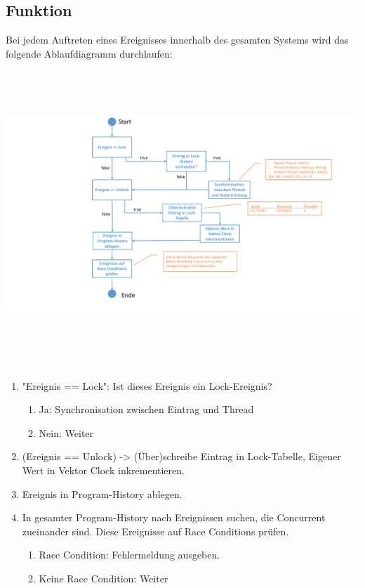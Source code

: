 \documentclass[10pt,a4paper]{article}
\begin{document}
\subsection{Funktion}
\begin{flushleft}
Bei jedem Auftreten eines Ereignisses innerhalb des gesamten Systems wird das folgende Ablaufdiagramm durchlaufen:\\[0,5cm]
	\includegraphics[width=16cm,height=11.5cm,trim=60mm 0mm 20mm 0mm, clip]{pictures/Ablaufdiagramm_Algorithmus.pdf}\\

\begin{enumerate}
\item "Ereignis == Lock": Ist dieses Ereignis ein Lock-Ereignis?
	\begin{enumerate}
	\item Ja: Synchronisation zwischen Eintrag und Thread
	\item Nein: Weiter
	\end{enumerate}
\item (Ereignis == Unlock) -> (Über)schreibe Eintrag in Lock-Tabelle, Eigener Wert in Vektor Clock inkrementieren.
\item Ereignis in Program-History ablegen.
\item In gesamter Program-History nach Ereignissen suchen, die Concurrent zueinander sind. Diese Ereignisse auf Race Conditions prüfen.
	\begin{enumerate}
	\item Race Condition: Fehlermeldung ausgeben.
	\item Keine Race Condition: Weiter
	\end{enumerate}
\end{enumerate}
\end{flushleft}
\end{document}
